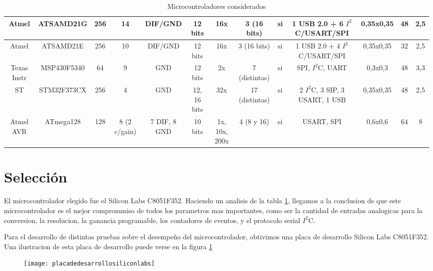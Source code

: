 \begin{landscape}
\begin{table}[!]
\begin{flushleft}
{\begin{tabular}{|c|c|c|c|c|c|c|c|c|c|c|c|c|}
\hline
 Atmel & ATSAMD21G &    256 &     14 & DIF/GND & 12 bits &    16x & 3 (16 bits) &     si & 1 USB 2.0 + 6 $I^{2}$C/USART/SPI & 0,35x0,35 &     48 &    2,5 \\
\hline
 Atmel & ATSAMD21E &    256 &     10 & DIF/GND & 12 bits &    16x & 3 (16 bits) &     si & 1 USB 2.0 + 4 $I^{2}$C/USART/SPI & 0,35x0,35 &     32 &    2,5 \\
\hline
Texas Instr & MSP430F5340 &     64 &      9 &    GND & 12 bits &     2x & 7 (distintas) &     si & SPI, $I^{2}$C, UART & 0,3x0,3 &     48 &    3,3 \\
\hline
    ST & STM32F373CX &    256 &      4 &    GND & 12, 16 bits &    32x & 17 (distintas) &     si & 2 $I^{2}$C, 3 SIP, 3 USART, 1 USB & 0,35x0,35 &     48 &    2,5 \\
\hline
Atmel AVR & ATmega128 &    128 & 8 (2 c/gain) & 7 DIF, 8 GND & 10 bits & 1x, 10x, 200x & 4 (8 y 16) &     si & USART, SPI & 0,6x0,6 &     64 &      8 \\
\hline
\end{tabular}



}
\end{flushleft}
  \caption{Microcontroladores considerados}\label{tabla_micros}
\end{table}

\end{landscape}




\section{Selección} %
\label{it1:sec:seleccion}

El microcontrolador elegido fue el Silicon Labs C8051F352. Haciendo un analisis de la tabla \ref{tabla_micros}, llegamos a la conclusion de que este microcontrolador es el mejor comprommiso de todos los parametros mas importantes, como ser la cantidad de entradas analogicas para la conversion, la resolucion, la ganancia programable, los contadores de eventos, y el protocolo serial $I^{2}$C.

Para el desarrollo de distintas pruebas sobre el desempeño del microcontrolador, obtivimos una placa de desarrollo Silicon Labs C8051F352. Una ilustracion de esta placa de desarrollo puede verse en la figura \ref{fig:placadedesarrollosiliconlabs}

\begin{figure}[h]
  \centering
  \texttt{[image: placadedesarrollosiliconlabs]}
  \caption{}\label{fig:placadedesarrollosiliconlabs}
\end{figure}



